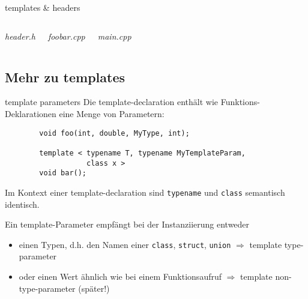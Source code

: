 \begin{frame}{templates \& headers}
	\begin{columns}[t]
			\emph{header.h}
			
		
		\pause
			\emph{foobar.cpp}
			
			\pause
			\emph{main.cpp}
			
	\end{columns}
\end{frame}


\subsection{Mehr zu templates}

\begin{frame}[fragile]{template parameters}
	Die template-declaration enthält wie Funktions-Deklarationen eine Menge von Parametern:
	\begin{lstlisting}
		void foo(int, double, MyType, int);
		
		template < typename T, typename MyTemplateParam,
		           class x >
		void bar();
	\end{lstlisting}
	
	Im Kontext einer template-declaration sind \verb|typename| und \verb|class| semantisch identisch.
	
	\pause
	
	Ein template-Parameter empfängt bei der Instanziierung entweder
	\begin{itemize}
		\item einen Typen, d.h. den Namen einer \verb|class|, \verb|struct|, \verb|union| $\Rightarrow$ template type-parameter
		\item oder einen Wert ähnlich wie bei einem Funktionsaufruf $\Rightarrow$ template non-type-parameter \alert{(später!)}
	\end{itemize}
\end{frame}

